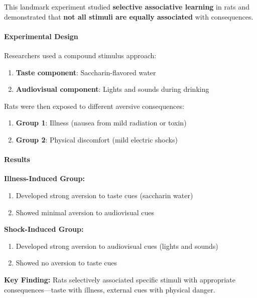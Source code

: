 This landmark experiment studied \textbf{selective associative learning} in rats and demonstrated that \textbf{not all stimuli are equally associated} with consequences.

\paragraph{Experimental Design}
\label{para:garcia-design}

Researchers used a compound stimulus approach:

\begin{enumerate}
\item \textbf{Taste component}: Saccharin-flavored water
\item \textbf{Audiovisual component}: Lights and sounds during drinking
\end{enumerate}

Rats were then exposed to different aversive consequences:

\begin{enumerate}
\item \textbf{Group 1}: Illness (nausea from mild radiation or toxin)
\item \textbf{Group 2}: Physical discomfort (mild electric shocks)
\end{enumerate}

\paragraph{Results}
\label{para:garcia-results}

\textbf{Illness-Induced Group:}

\begin{enumerate}
\item Developed strong aversion to taste cues (saccharin water)
\item Showed minimal aversion to audiovisual cues
\end{enumerate}

\textbf{Shock-Induced Group:}

\begin{enumerate}
\item Developed strong aversion to audiovisual cues (lights and sounds)  
\item Showed no aversion to taste cues
\end{enumerate}

\textbf{Key Finding:} Rats selectively associated specific stimuli with appropriate consequences—taste with illness, external cues with physical danger.

